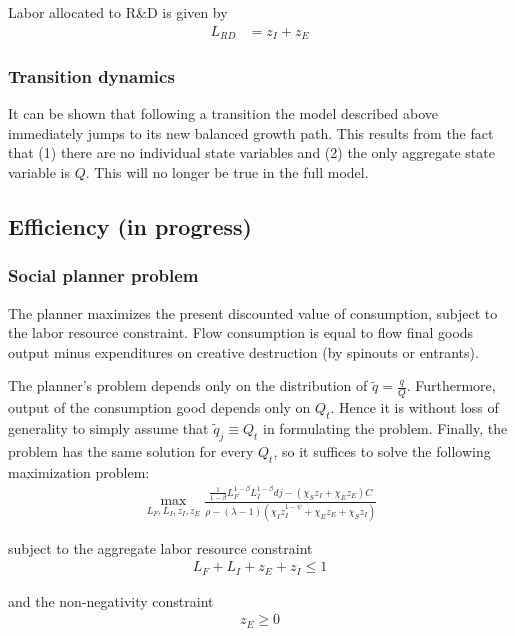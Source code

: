 \documentclass[12pt,english]{article}
\theoremstyle{remark}
\begin{document}
Labor allocated to R\&D is given by
\begin{align} 
	L_{RD} &= z_I + z_E \label{simplified_RDlabor_aggregation}
\end{align}



\subsubsection{Transition dynamics}

It can be shown that following a transition the model described above immediately jumps to its new balanced growth path. This results from the fact that (1) there are no individual state variables and (2) the only aggregate state variable is $Q$. This will no longer be true in the full model.

\subsection{Efficiency (in progress)}

\subsubsection{Social planner problem}

The planner maximizes the present discounted value of consumption, subject to the labor resource constraint. Flow consumption is equal to flow final goods output minus expenditures on creative destruction (by spinouts or entrants).  

The planner's problem depends only on the distribution of $\tilde{q} = \frac{q}{Q}$. Furthermore, output of the consumption good depends only on $Q_t$. Hence it is without loss of generality to simply assume that $\tilde{q}_j \equiv Q_t$ in formulating the problem. Finally, the problem has the same solution for every $Q_t$, so it suffices to solve the following maximization problem:
\begin{align*}
\max_{L_F,L_I,z_I,z_E} \frac{\frac{1}{1-\beta} L_F^{1-\beta} L_I^{1-\beta} dj - (\chi_S z_I + \chi_E z_E) C}{\rho - (\lambda-1)(\chi_I z_I^{1-\psi} + \chi_E z_E + \chi_S z_I)} 
\end{align*}

subject to the aggregate labor resource constraint
\begin{align*}
L_F + L_I + z_E + z_I \le 1
\end{align*}

and the non-negativity constraint
\begin{align*}
	z_E \ge 0
\end{align*}
\end{document}
